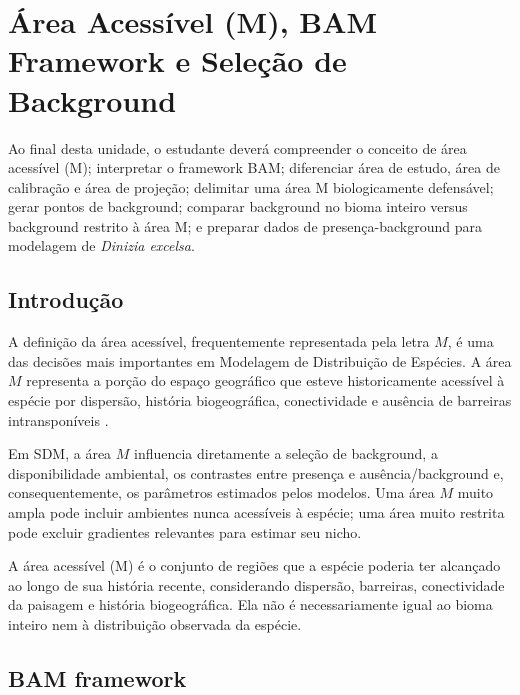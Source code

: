 \chapter[Área acessível M]{Área Acessível (M), BAM Framework e Seleção de Background}

\begin{objetivos}
	Ao final desta unidade, o estudante deverá compreender o conceito de área acessível (M); interpretar o framework BAM; diferenciar área de estudo, área de calibração e área de projeção; delimitar uma área M biologicamente defensável; gerar pontos de background; comparar background no bioma inteiro versus background restrito à área M; e preparar dados de presença-background para modelagem de \textit{Dinizia excelsa}.
\end{objetivos}

\section{Introdução}

A definição da área acessível, frequentemente representada pela letra \(M\), é uma das decisões mais importantes em Modelagem de Distribuição de Espécies. A área \(M\) representa a porção do espaço geográfico que esteve historicamente acessível à espécie por dispersão, história biogeográfica, conectividade e ausência de barreiras intransponíveis \parencite{soberon2005,soberon2007,soberon2009,barve2011crucial}.

Em SDM, a área \(M\) influencia diretamente a seleção de background, a disponibilidade ambiental, os contrastes entre presença e ausência/background e, consequentemente, os parâmetros estimados pelos modelos. Uma área \(M\) muito ampla pode incluir ambientes nunca acessíveis à espécie; uma área muito restrita pode excluir gradientes relevantes para estimar seu nicho.

\begin{conceito}[title={\faBook\quad Área acessível (M)}]
	A área acessível (M) é o conjunto de regiões que a espécie poderia ter alcançado ao longo de sua história recente, considerando dispersão, barreiras, conectividade da paisagem e história biogeográfica. Ela não é necessariamente igual ao bioma inteiro nem à distribuição observada da espécie.
\end{conceito}

\section{BAM framework}

